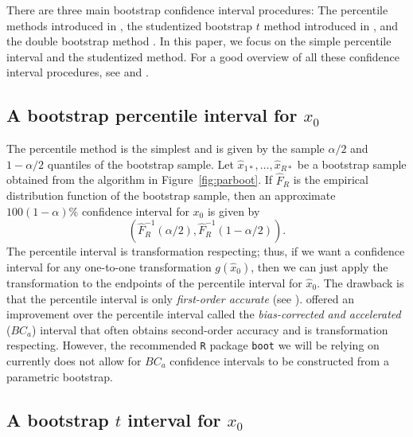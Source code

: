 \documentclass{article}\usepackage[]{graphicx}\usepackage[]{color}
\begin{document}
There are three main bootstrap confidence interval procedures: The percentile methods introduced in \citet{efron-bootstrap-1979}, the studentized bootstrap $t$ method introduced in \citet{efron-jackknife-1982}, and the double bootstrap method \citep{hall-bootstrap-1986}.  In this paper, we focus on the simple percentile interval and the studentized method.  For a good overview of all these confidence interval procedures, see \citet[chap. 5]{hinkley-bootstrap-1997} and \citet[chap. 11]{boos-essential-2013}.


\subsection{A bootstrap percentile interval for $x_0$}

The percentile method is the simplest and is given by the sample $\alpha/2$ and $1-\alpha/2$ quantiles of the bootstrap sample.  Let $\widehat{x}_{1*}, \dotsc, \widehat{x}_{R*}$ be a bootstrap sample obtained from the algorithm in Figure~\ref{fig:parboot}.  If $\widehat{F}_R$ is the empirical distribution function of the bootstrap sample, then an approximate $100(1-\alpha)\%$ confidence interval for $x_0$ is given by
\[
  \left( \widehat{F}_R^{-1}(\alpha/2), \widehat{F}_R^{-1}(1-\alpha/2) \right).
\]
The percentile interval is transformation respecting; thus, if we want a confidence interval for any one-to-one transformation $g\left(\widehat{x}_0\right)$, then we can just apply the transformation to the endpoints of the percentile interval for $\widehat{x}_0$.  The drawback is that the percentile interval is only \emph{first-order accurate} (see \citet[pp. 429-430]{boos-essential-2013}).  \citet{efron-better-1987} offered an improvement over the percentile interval called the \emph{bias-corrected and accelerated} ($BC_a$) interval that often obtains second-order accuracy and is transformation respecting.  However, the recommended \texttt{R} package \texttt{boot} \citep{canty-boot-2013} we will be relying on currently does not allow for $BC_a$ confidence intervals to be constructed from a parametric bootstrap.


\subsection{A bootstrap $t$ interval for $x_0$}
\end{document}
